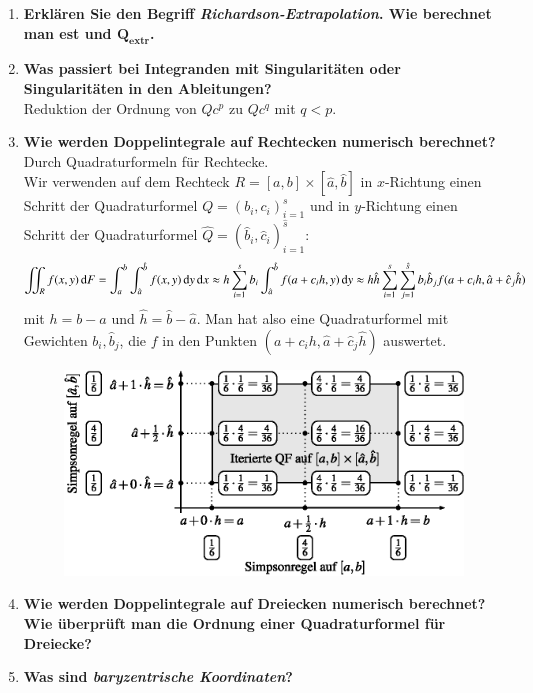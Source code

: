 \begin{enumerate}
		
		\item \textbf{Erklären Sie den Begriff \textit{Richardson-Extrapolation}. Wie berechnet man est und $\mathbf{Q_{extr}}$.} \\
			
		
		\item \textbf{Was passiert bei Integranden mit Singularitäten oder Singularitäten in den Ableitungen?} \\
			Reduktion der Ordnung von \(Qc^p\) zu \(Qc^q\) mit \(q<p\).
		
		\pagebreak
		\item \textbf{Wie werden Doppelintegrale auf Rechtecken numerisch berechnet?} \\
			Durch Quadraturformeln für Rechtecke. \\
			Wir verwenden auf dem Rechteck \(R=[a,b]\times[\hat{a},\hat{b}]\) in \(x\)-Richtung einen Schritt der Quadraturformel \(Q=(b_i,c_i)^s_{i=1}\) und in \(y\)-Richtung einen Schritt der Quadraturformel \(\hat{Q}=(\hat{b}_i,\hat{c}_i)^{\hat{s}}_{i=1}\):
			\begin{align*}
				\iint_Rf(x,y)\dif{F}=\int_{a}^{b}\int_{\hat{a}}^{\hat{b}}f(x,y)\dif{y}\dif{x}\approx h\sum_{i=1}^{s}b_i\int_{\hat{a}}^{\hat{b}}f(a+c_ih,y)\dif{y}\approx h\hat{h}\sum_{i=1}^{s}\sum_{j=	1}^{\hat{s}}b_i\hat{b}_jf(a+c_ih,\hat{a}+\hat{c}_j\hat{h})
			\end{align*}
			mit \(h=b-a\) und \(\hat{h}=\hat{b}-\hat{a}\). Man hat also eine Quadraturformel mit Gewichten \(b_i,\hat{b}_j\), die \(f\) in den Punkten \((a+c_ih,\hat{a}+\hat{c}_j\hat{h})\) auswertet.
			\begin{figure}[htbp]
				\centering
				\includegraphics[width=0.7\linewidth]{kap4_3}
			\end{figure}
		
		\item \textbf{Wie werden Doppelintegrale auf Dreiecken numerisch berechnet? Wie überprüft man die Ordnung einer Quadraturformel für Dreiecke?} \\
		
		\item \textbf{Was sind \textit{baryzentrische Koordinaten}?} \\
		
	\end{enumerate}